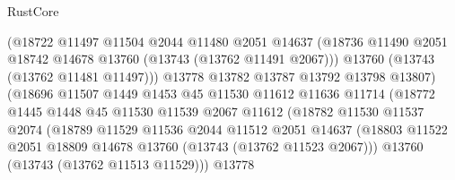 \begin{lexlean}{RustCore}
\begin{coremodule}
                                (@18722
                                  @11497
                                  @11504
                                  @2044
                                  @11480
                                  @2051
                                  @14637
                                  (@18736
                                    @11490
                                    @2051
                                    @18742
                                    @14678
                                    @13760
                                    (@13743 (@13762 @11491 @2067)))
                                  @13760
                                  (@13743 (@13762 @11481 @11497)))
                                @13778
                                @13782
                                @13787
                                @13792
                                @13798
                                @13807)
                              (@18696
                                @11507
                                @1449
                                @1453
                                @45
                                @11530
                                @11612
                                @11636
                                @11714
                                (@18772
                                  @1445
                                  @1448
                                  @45
                                  @11530
                                  @11539
                                  @2067
                                  @11612
                                  (@18782
                                    @11530
                                    @11537
                                    @2074
                                    (@18789
                                      @11529
                                      @11536
                                      @2044
                                      @11512
                                      @2051
                                      @14637
                                      (@18803
                                        @11522
                                        @2051
                                        @18809
                                        @14678
                                        @13760
                                        (@13743 (@13762 @11523 @2067)))
                                      @13760
                                      (@13743 (@13762 @11513 @11529)))
                                    @13778

\end{coremodule}
\end{lexlean}
